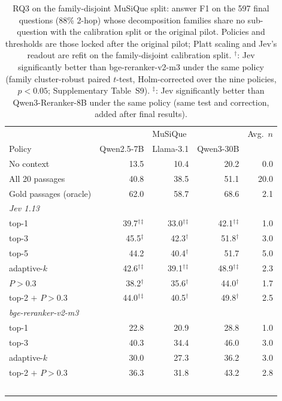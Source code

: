 \begin{table}[t]
\centering
\footnotesize
\setlength{\tabcolsep}{4pt}
\caption{RQ3 on the family-disjoint MuSiQue split: answer F1 on the 597 final questions (88\% 2-hop) whose decomposition families share no sub-question with the calibration split or the original pilot. Policies and thresholds are those locked after the original pilot; Platt scaling and Jev's readout are refit on the family-disjoint calibration split. $^\dagger$: Jev significantly better than bge-reranker-v2-m3 under the same policy (family cluster-robust paired $t$-test, Holm-corrected over the nine policies, $p<0.05$; Supplementary Table~S9). $^\ddagger$: Jev significantly better than Qwen3-Reranker-8B under the same policy (same test and correction, added after final results).}
\label{tab:rag-fd}
\begin{tabular}{lrrrr}
\toprule
 & \multicolumn{3}{c}{MuSiQue} & Avg.\ $n$ \\
Policy & Qwen2.5-7B & Llama-3.1 & Qwen3-30B &  \\
\midrule
No context & 13.5 & 10.4 & 20.2 & 0.0 \\
All 20 passages & 40.8 & 38.5 & 51.1 & 20.0 \\
Gold passages (oracle) & 62.0 & 58.7 & 68.6 & 2.1 \\
\multicolumn{5}{l}{\textit{Jev 1.13}} \\
\quad top-1 & 39.7$^\dagger$$^\ddagger$ & 33.0$^\dagger$$^\ddagger$ & 42.1$^\dagger$$^\ddagger$ & 1.0 \\
\quad top-3 & 45.5$^\ddagger$ & 42.3$^\dagger$ & 51.8$^\dagger$ & 3.0 \\
\quad top-5 & 44.2 & 40.4$^\dagger$ & 51.7 & 5.0 \\
\quad adaptive-$k$ & 42.6$^\dagger$$^\ddagger$ & 39.1$^\dagger$$^\ddagger$ & 48.9$^\dagger$$^\ddagger$ & 2.3 \\
\quad $P>0.3$ & 38.2$^\dagger$ & 35.6$^\dagger$ & 44.0$^\dagger$ & 1.7 \\
\quad top-2 $+$ $P>0.3$ & 44.0$^\dagger$$^\ddagger$ & 40.5$^\dagger$ & 49.8$^\dagger$ & 2.5 \\
\multicolumn{5}{l}{\textit{bge-reranker-v2-m3}} \\
\quad top-1 & 22.8 & 20.9 & 28.8 & 1.0 \\
\quad top-3 & 40.3 & 34.4 & 46.0 & 3.0 \\
\quad adaptive-$k$ & 30.0 & 27.3 & 36.2 & 3.0 \\
\quad top-2 $+$ $P>0.3$ & 36.3 & 31.8 & 43.2 & 2.8 \\
$$
\end{tabular}
\end{table}
